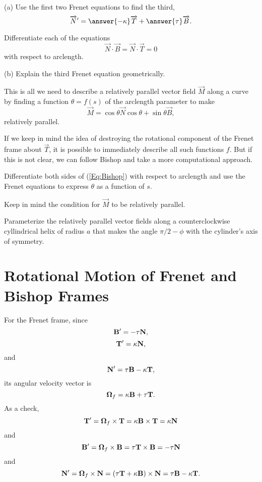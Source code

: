 \documentclass{ximera}
\begin{document}
\begin{exercise}   \label{QQ:Podsfgttga}
(a) Use the first two Frenet equations to find the third,
\[
     \overrightarrow{N}^\prime = \answer{-\kappa} \overrightarrow{T} + \answer{\tau} \overrightarrow{B} .
\]
\begin{hint}
Differentiate each of the equations
\[
 \overrightarrow{N}\cdot \overrightarrow{B} = \overrightarrow{N}\cdot\overrightarrow{T} = 0
\]
with respect to arclength.
\end{hint}

(b) Explain the third Frenet equation geometrically.
\end{exercise}


This is all we need to describe a relatively parallel vector field $\overrightarrow{M}$ along a curve by finding a function $\theta = f(s)$ of the arclength parameter to make
\begin{equation}
          \overrightarrow{M} = \cos\theta \overrightarrow{N} \cos \theta + \sin\theta \overrightarrow{B} ,   \label{Eq:Bishop}
\end{equation}
relatively parallel.

If we keep in mind the idea of destroying the rotational component of the Frenet frame about $\overrightarrow{T}$, it is possible to immediately describe all such functions $f$. But if this is not clear, we can follow Bishop and take a more computational approach. 

\begin{exercise}  \label{E:dfstr35tr43}
Differentiate both sides of (\ref{Eq:Bishop}) with respect to arclength and use the Frenet equations to express $\theta$ as a function of $s$.

\begin{hint}
Keep in mind the condition for $\overrightarrow{M}$ to be relatively parallel. 
\end{hint}
\end{exercise}

\begin{exercise}  \label{E:MDnfddd}
Parameterize the relatively parallel vector fields along a counterclockwise cyllindrical helix of radius $a$ that makes the angle $\pi/2 - \phi$ with the cylinder's axis of symmetry.
\end{exercise}


\section*{Rotational Motion of Frenet and Bishop Frames}
For the Frenet frame, since
\[
      {\bf B}^\prime = -\tau {\bf N} ,
\]
\[
   {\bf T}^\prime = \kappa {\bf N},
\]
and
\[
   {\bf N}^\prime = \tau {\bf B} -\kappa {\bf T}  ,
\]
its angular velocity vector is 
\[
  \boldsymbol{\Omega}_f =   \kappa {\bf B} + \tau {\bf T}  .
\]
As a check, 
\[
    {\bf T}^\prime =    \boldsymbol{\Omega}_f \times {\bf T} = \kappa {\bf B} \times {\bf T} = \kappa {\bf N} 
\]
and 
\[
    {\bf B}^\prime =    \boldsymbol{\Omega}_f \times {\bf B} = \tau {\bf T} \times {\bf B} = - \tau {\bf N} 
\]
and
\[
    {\bf N}^\prime =    \boldsymbol{\Omega}_f \times {\bf N} =  (\tau {\bf T} + \kappa {\bf B})\times {\bf N} = \tau {\bf B}-\kappa{\bf T} .
\]
\end{document}

